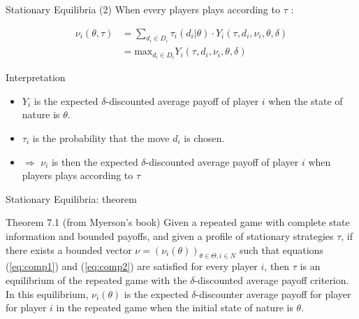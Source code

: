 \begin{frame}{Stationary Equilibria (2)}
    When every players plays according to $\tau$ :

    \begin{small}
        \begin{align}
            \nu_i(\theta, \tau) &= \sum_{d_i \in D_i} \tau_i(d_i|\theta) \cdot
            Y_i(\tau, d_i, \nu_i, \theta, \delta) \label{eq:comp1} \\
            &= \text{max}_{d_i \in D_i} Y_i(\tau, d_i, \nu_i, \theta, \delta)
            \label{eq:comp2}
        \end{align}
    \end{small}

    \begin{exampleblock}{Interpretation}
        \begin{itemize}
            \item $Y_i$ is the expected $\delta$-discounted average payoff of player $i$ when the
            state of nature is $\theta$.
            \item $\tau_i$ is the probability that the move $d_i$ is chosen.
            \item $\Rightarrow$ $\nu_i$ is then the expected $\delta$-discounted average payoff of
            player $i$ when players plays according to $\tau$
        \end{itemize}
    \end{exampleblock}
\end{frame}

\begin{frame}{Stationary Equilibria: theorem}
    \begin{block}{Theorem 7.1 (from Myerson's book)}
	    Given a repeated game with complete state information and bounded payoffs, and given a
        profile of stationary strategies $\tau$, if there exists a bounded vector
        $\nu = (\nu_i(\theta))_{\theta \in \Theta, i \in N}$ such that equations (\ref{eq:comp1})
        and (\ref{eq:comp2}) are satisfied for every player $i$, then $\tau$ is an equilibrium
        of the repeated game with the $\delta$-discounted average payoff criterion. In this
        equilibrium, $\nu_i(\theta)$ is the expected $\delta$-discounter average payoff for player
        for player $i$ in the repeated game when the initial state of nature is $\theta$.
    \end{block}
\end{frame}

